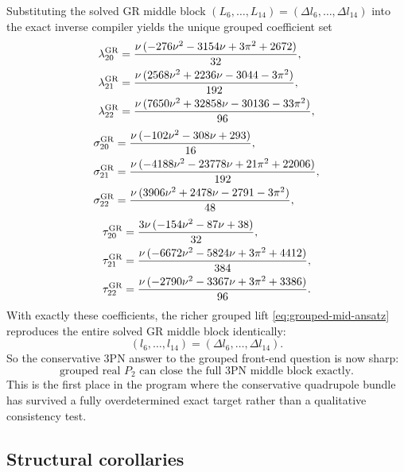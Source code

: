 \documentclass[11pt]{article}
\begin{document}
Substituting the solved GR middle block
\((L_6,\dots,L_{14})=(\Delta l_6,\dots,\Delta l_{14})\)
into the exact inverse compiler yields the unique grouped coefficient set
\begin{align}
\lambda_{20}^{\rm GR}
&=\frac{\nu\,(-276\nu^2-3154\nu+3\pi^2+2672)}{32},
\nonumber\\
\lambda_{21}^{\rm GR}
&=\frac{\nu\,(2568\nu^2+2236\nu-3044-3\pi^2)}{192},
\nonumber\\
\lambda_{22}^{\rm GR}
&=\frac{\nu\,(7650\nu^2+32858\nu-30136-33\pi^2)}{96},
\label{eq:grouped-lambda-gr}
\end{align}
\begin{align}
\sigma_{20}^{\rm GR}
&=\frac{\nu\,(-102\nu^2-308\nu+293)}{16},
\nonumber\\
\sigma_{21}^{\rm GR}
&=\frac{\nu\,(-4188\nu^2-23778\nu+21\pi^2+22006)}{192},
\nonumber\\
\sigma_{22}^{\rm GR}
&=\frac{\nu\,(3906\nu^2+2478\nu-2791-3\pi^2)}{48},
\label{eq:grouped-sigma-gr}
\end{align}
\begin{align}
\tau_{20}^{\rm GR}
&=\frac{3\nu\,(-154\nu^2-87\nu+38)}{32},
\nonumber\\
\tau_{21}^{\rm GR}
&=\frac{\nu\,(-6672\nu^2-5824\nu+3\pi^2+4412)}{384},
\nonumber\\
\tau_{22}^{\rm GR}
&=\frac{\nu\,(-2790\nu^2-3367\nu+3\pi^2+3386)}{96}.
\label{eq:grouped-tau-gr}
\end{align}
With exactly these coefficients, the richer grouped lift
\eqref{eq:grouped-mid-ansatz} reproduces the entire solved GR middle block
identically:
\begin{equation}
(l_6,\dots,l_{14})=(\Delta l_6,\dots,\Delta l_{14}).
\label{eq:grouped-exact-middle-fit}
\end{equation}
So the conservative $3$PN answer to the grouped front-end question is now sharp:
\begin{equation}
\boxed{\text{grouped real }P_2\text{ can close the full $3$PN middle block exactly.}}
\label{eq:grouped-main-theorem}
\end{equation}
This is the first place in the program where the conservative quadrupole bundle
has survived a fully overdetermined exact target rather than a qualitative
consistency test.

\subsection{Structural corollaries}
\label{sec:grouped-corollaries}
\end{document}
